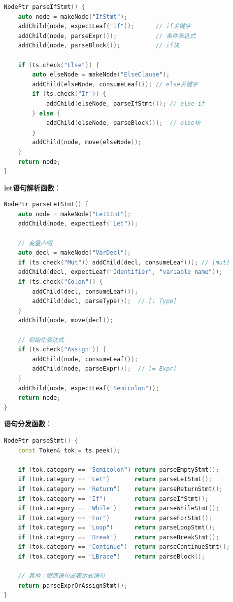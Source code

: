 \documentclass[12pt,a4paper]{ctexart}
\begin{document}
\begin{lstlisting}[language=C++, caption={parseIfStmt函数实现}]
NodePtr parseIfStmt() {
    auto node = makeNode("IfStmt");
    addChild(node, expectLeaf("If"));      // if关键字
    addChild(node, parseExpr());           // 条件表达式
    addChild(node, parseBlock());          // if块

    if (ts.check("Else")) {
        auto elseNode = makeNode("ElseClause");
        addChild(elseNode, consumeLeaf()); // else关键字
        if (ts.check("If")) {
            addChild(elseNode, parseIfStmt()); // else-if
        } else {
            addChild(elseNode, parseBlock());  // else块
        }
        addChild(node, move(elseNode));
    }
    return node;
}
\end{lstlisting}

\textbf{let语句解析函数}：

\begin{lstlisting}[language=C++, caption={parseLetStmt函数实现}]
NodePtr parseLetStmt() {
    auto node = makeNode("LetStmt");
    addChild(node, expectLeaf("Let"));

    // 变量声明
    auto decl = makeNode("VarDecl");
    if (ts.check("Mut")) addChild(decl, consumeLeaf()); // [mut]
    addChild(decl, expectLeaf("Identifier", "variable name"));
    if (ts.check("Colon")) {
        addChild(decl, consumeLeaf());
        addChild(decl, parseType());  // [: Type]
    }
    addChild(node, move(decl));

    // 初始化表达式
    if (ts.check("Assign")) {
        addChild(node, consumeLeaf());
        addChild(node, parseExpr());  // [= Expr]
    }
    addChild(node, expectLeaf("Semicolon"));
    return node;
}
\end{lstlisting}

\textbf{语句分发函数}：

\begin{lstlisting}[language=C++, caption={parseStmt语句分发}]
NodePtr parseStmt() {
    const Token& tok = ts.peek();

    if (tok.category == "Semicolon") return parseEmptyStmt();
    if (tok.category == "Let")       return parseLetStmt();
    if (tok.category == "Return")    return parseReturnStmt();
    if (tok.category == "If")        return parseIfStmt();
    if (tok.category == "While")     return parseWhileStmt();
    if (tok.category == "For")       return parseForStmt();
    if (tok.category == "Loop")      return parseLoopStmt();
    if (tok.category == "Break")     return parseBreakStmt();
    if (tok.category == "Continue")  return parseContinueStmt();
    if (tok.category == "LBrace")    return parseBlock();

    // 其他：赋值语句或表达式语句
    return parseExprOrAssignStmt();
}
\end{lstlisting}
\end{document}
